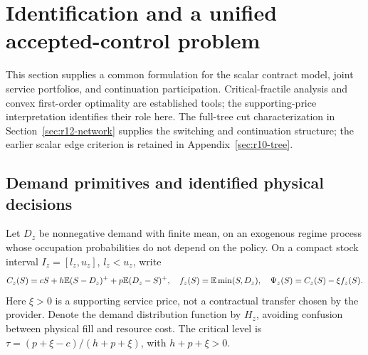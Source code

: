 \section{Identification and a unified accepted-control problem}\label{sec:r10-general}
This section supplies a common formulation for the scalar contract model, joint service portfolios, and continuation participation. Critical-fractile analysis and convex first-order optimality are established tools; the supporting-price interpretation identifies their role here. The full-tree cut characterization in Section~\ref{sec:r12-network} supplies the switching and continuation structure; the earlier scalar edge criterion is retained in Appendix~\ref{sec:r10-tree}.

\subsection{Demand primitives and identified physical decisions}
Let $D_z$ be nonnegative demand with finite mean, on an exogenous regime process whose occupation probabilities do not depend on the policy. On a compact stock interval $I_z=[l_z,u_z]$, $l_z<u_z$, write
\[
 C_z(S)=cS+h\mathbb E(S-D_z)^++p\mathbb E(D_z-S)^+,\quad
 f_z(S)=\mathbb E\min(S,D_z),\quad \Psi_z(S)=C_z(S)-\xi f_z(S).
\]
Here $\xi>0$ is a supporting service price, not a contractual transfer chosen by the provider. Denote the demand distribution function by $H_z$, avoiding confusion between physical fill and resource cost. The critical level is $\tau=(p+\xi-c)/(h+p+\xi)$, with $h+p+\xi>0$.


